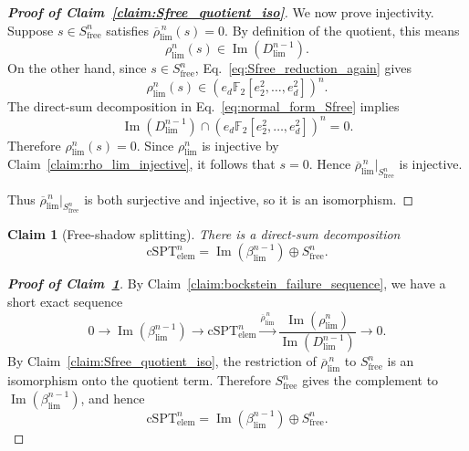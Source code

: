 \documentclass[aps,prx,reprint,superscriptaddress,twocolumn,amsmath,amssymb,amsfonts, nofootinbib]{revtex4-2}
\theoremstyle{apsstyle}
\newtheorem{claim}{Claim}
\begin{document}
\begin{proof}[\textnormal{\textbf{Proof of Claim~\ref{claim:Sfree_quotient_iso}}}]
\bigskip

\noindent We now prove injectivity. Suppose $s\in S_{\mathrm{free}}^n$ satisfies $ \overline{\rho}_{\lim}^{\,n}(s)=0$. By definition of the quotient, this means
\begin{equation}
\rho_{\lim}^{n}(s)\in \operatorname{Im}(D_{\lim}^{n-1}).
\end{equation}
On the other hand, since $s\in S_{\mathrm{free}}^n$, Eq.~\eqref{eq:Sfree_reduction_again} gives
\begin{equation}
\rho_{\lim}^{n}(s)
\in
\left(e_d\mathbb F_2[e_2^2,\dots,e_d^2]\right)^n.
\end{equation}
The direct-sum decomposition in Eq.~\eqref{eq:normal_form_Sfree} implies
\begin{equation}
\operatorname{Im}(D_{\lim}^{n-1})
\cap
\left(e_d\mathbb F_2[e_2^2,\dots,e_d^2]\right)^n
=
0.
\end{equation}
Therefore $\rho_{\lim}^{n}(s)=0$. Since $\rho_{\lim}^{n}$ is injective by Claim~\ref{claim:rho_lim_injective}, it follows that $s=0$. Hence $\overline{\rho}_{\lim}^{\,n}\big\vert_{S_{\mathrm{free}}^n}$ is injective.

\noindent Thus $\overline{\rho}_{\lim}^{\,n}\big\vert_{S_{\mathrm{free}}^n}$ is both surjective and injective, so it is an isomorphism.
\end{proof}

\bigskip 

\begin{claim}[Free-shadow splitting] 
\label{claim:Sfree_splitting} There is a direct-sum decomposition 
\begin{equation} \mathrm{cSPT}_{\mathrm{elem}}^n = \operatorname{Im}(\beta_{\lim}^{n-1}) \oplus S_{\mathrm{free}}^n . 
\end{equation} 
\end{claim} 
\begin{proof}[\textnormal{\textbf{Proof of Claim~\ref{claim:Sfree_splitting}}}]
By Claim~\ref{claim:bockstein_failure_sequence}, we have a short exact sequence
\begin{equation}
0
\longrightarrow
\operatorname{Im}(\beta_{\lim}^{n-1})
\longrightarrow
\mathrm{cSPT}_{\mathrm{elem}}^n
\xrightarrow{\overline{\rho}_{\lim}^{\,n}}
\frac{\operatorname{Im}(\rho_{\lim}^{n})}
{\operatorname{Im}(D_{\lim}^{n-1})}
\longrightarrow
0.
\end{equation}
By Claim~\ref{claim:Sfree_quotient_iso}, the restriction of $\overline{\rho}_{\lim}^{\,n}$ to $S_{\mathrm{free}}^n$ is an isomorphism onto the quotient term. Therefore $S_{\mathrm{free}}^n$ gives the complement to $\operatorname{Im}(\beta_{\lim}^{n-1})$, and hence
\begin{equation}
\mathrm{cSPT}_{\mathrm{elem}}^n
=
\operatorname{Im}(\beta_{\lim}^{n-1})
\oplus
S_{\mathrm{free}}^n.
\end{equation}
\end{proof}
\end{document}
